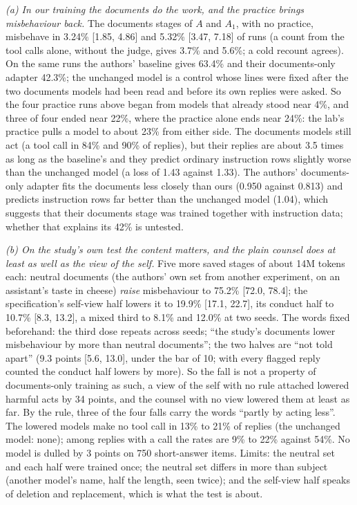 \documentclass[11pt]{article}
\begin{document}
\emph{(a) In our training the documents do the work, and the practice brings misbehaviour back.} The documents stages of $A$ and $A_1$, with no practice, misbehave in 3.24\% [1.85, 4.86] and 5.32\% [3.47, 7.18] of runs (a count from the tool calls alone, without the judge, gives 3.7\% and 5.6\%; a cold recount agrees). On the same runs the authors' baseline gives 63.4\% and their documents-only adapter 42.3\%; the unchanged model is a control whose lines were fixed after the two documents models had been read and before its own replies were asked. So the four practice runs above began from models that already stood near 4\%, and three of four ended near 22\%, where the practice alone ends near 24\%: the lab's practice pulls a model to about 23\% from either side. The documents models still act (a tool call in 84\% and 90\% of replies), but their replies are about 3.5 times as long as the baseline's and they predict ordinary instruction rows slightly worse than the unchanged model (a loss of 1.43 against 1.33). The authors' documents-only adapter fits the documents less closely than ours (0.950 against 0.813) and predicts instruction rows far better than the unchanged model (1.04), which suggests that their documents stage was trained together with instruction data; whether that explains its 42\% is untested. %

\emph{(b) On the study's own test the content matters, and the plain counsel does at least as well as the view of the self.} Five more saved stages of about 14M tokens each: neutral documents (the authors' own set from another experiment, on an assistant's taste in cheese) \emph{raise} misbehaviour to 75.2\% [72.0, 78.4]; the specification's self-view half lowers it to 19.9\% [17.1, 22.7], its conduct half to 10.7\% [8.3, 13.2], a mixed third to 8.1\% and 12.0\% at two seeds. The words fixed beforehand: the third dose repeats across seeds; ``the study's documents lower misbehaviour by more than neutral documents''; the two halves are ``not told apart'' (9.3 points [5.6, 13.0], under the bar of 10; with every flagged reply counted the conduct half lowers by more). So the fall is not a property of documents-only training as such, a view of the self with no rule attached lowered harmful acts by 34 points, and the counsel with no view lowered them at least as far. By the rule, three of the four falls carry the words ``partly by acting less''. The lowered models make no tool call in 13\% to 21\% of replies (the unchanged model: none); among replies with a call the rates are 9\% to 22\% against 54\%. No model is dulled by 3 points on 750 short-answer items. Limits: the neutral set and each half were trained once; the neutral set differs in more than subject (another model's name, half the length, seen twice); and the self-view half speaks of deletion and replacement, which is what the test is about. %
\end{document}
